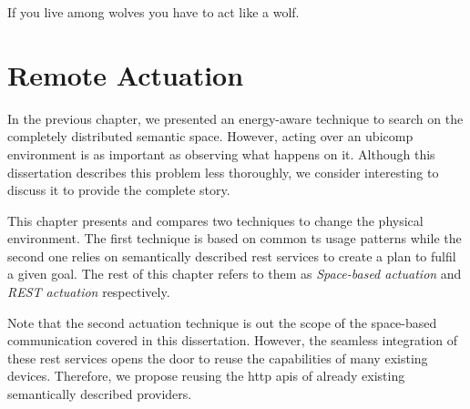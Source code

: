 
\begin{savequote}[50mm]
If you live among wolves you have to act like a wolf.
\end{savequote}


\chapter{Remote Actuation}
\label{cha:actuate}


\newcommand{\restdesc}{\emph{RESTdesc}}
\newcommand{\spaceActuation}{\emph{Space-based actuation}}
\newcommand{\restActuation}{\emph{REST actuation}}
\newcommand{\hybridActuation}{\emph{Hybrid actuation}}


\ifpdf
    \graphicspath{{\pathchapsix/figures/PNG/}{\pathchapsix/figures/PDF/}{\pathchapsix/figures/JPG/}{\pathchapsix/figures/}}
\else
    \graphicspath{{\pathchapsix/figures/EPS/}{\pathchapsix/figures/}}
\fi




In the previous chapter, we presented an energy-aware technique to search on the completely distributed semantic space. %
However, acting over an \ac{ubicomp} environment is as important as observing what happens on it.
Although this dissertation describes this problem less thoroughly, we consider interesting to discuss it to provide the complete story. %

\bigskip


This chapter presents and compares two techniques to change the physical environment.
The first technique is based on common \ac{ts} usage patterns while the second one relies on semantically described \ac{rest} services to create a plan to fulfil a given goal.
The rest of this chapter refers to them as \spaceActuation{} and \restActuation{} respectively.

Note that the second actuation technique is out the scope of the space-based communication covered in this dissertation.
However, the seamless integration of these \ac{rest} services opens the door to reuse the capabilities of many existing devices.
Therefore, we propose reusing the \acs{http} \acsp{api} of already existing semantically described providers.


